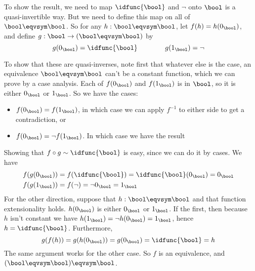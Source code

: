 To show the result, we need to map $\idfunc{\bool}$ and $\lnot$ onto $\bool$ is
a quasi-invertible way.  But we need to define this map on all of $\bool
\eqvsym \bool$.  So for any $h : \bool\eqvsym\bool$, let $f(h) = h(0_{\bool})$,
and define $g : \bool \to (\bool \eqvsym \bool)$ by
\[
  g(0_{\bool}) = \idfunc{\bool} 
  \qquad\qquad
  g(1_{\bool}) = \lnot
\]


To show that these are quasi-inverses,
note first that whatever else is the case, an equivalence
$\bool \eqvsym \bool$ can't be a constant function, which we can prove by a case
analysis.  Each of $f(0_{\bool})$ and $f(1_{\bool})$ is in $\bool$, so it is
either $0_{\bool}$ or $1_{\bool}$.  So we have the cases:



\begin{itemize}
\item  $f(0_{\bool}) = f(1_{\bool})$, in which case we can apply $f^{-1}$ to either side to get a contradiction, or

\item  $f(0_{\bool}) = \lnot f(1_{\bool})$. In which case we have the result

\end{itemize}
Showing that $f \circ g \sim \idfunc{\bool}$ is easy, since we can do it by
cases.  We have
\begin{align*}
  f(g(0_{\bool})) &= f(\idfunc{\bool}) = \idfunc{\bool}(0_{\bool}) = 0_{\bool}
  \\
  f(g(1_{\bool})) &= f(\lnot) = \lnot 0_{\bool} = 1_{\bool}
\end{align*}
For the other direction, suppose that $h : \bool \eqvsym \bool$ and that
function extensionality holds.
$h(0_{\bool})$ is either $0_{\bool}$ or $1_{\bool}$.  If the first, then
because $h$ isn't constant we have $h(1_{\bool}) = \lnot h(0_{\bool}) =
1_{\bool}$, hence $h = \idfunc{\bool}$.  Furthermore,
\[
  g(f(h)) = g(h(0_{\bool})) = g(0_{\bool}) = \idfunc{\bool} = h
\]
The same argument works for the other case.  So $f$ is an equivalence, and
$(\bool \eqvsym \bool) \eqvsym \bool$.


